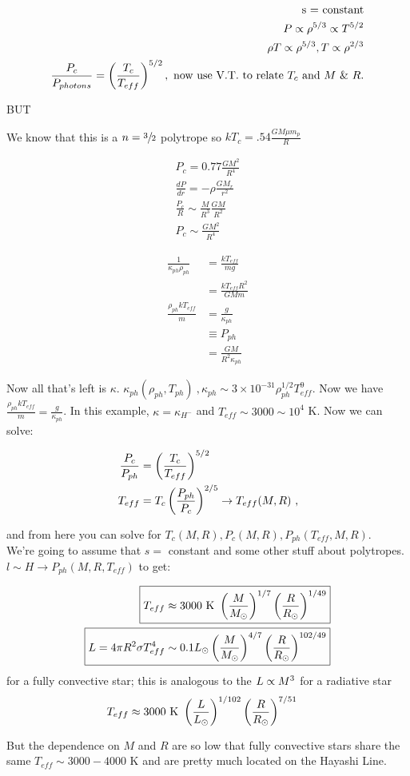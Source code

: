 \begin{align}
\text{s = constant}\\
P \propto \rho^{5/3} \propto T^{5/2}\\
\rho T \propto \rho^{5/3}, T \propto \rho^{2/3}\\
\frac{P_c}{P_{photons}} = \left( \frac{T_c}{T_{eff}} \right) ^{5/2},\text{ now use V.T. to relate $T_c$ and $M$ \& $R$.}
\end{align}
\begin{center}
{\Huge BUT}
\end{center}
We know that this is a $n=\sfrac{3}{2}$ polytrope so $kT_c = .54 \frac{GM\mu m_p}{R}$

\begin{align}
P_c = 0.77 \frac{GM^2}{R^4}\\
\frac{dP}{dr} = -\rho \frac{GM_r}{r^2}\\
\frac{P_c}{R} \sim \frac{M}{R^3}\frac{GM}{R^2}\\
P_c \sim \frac{GM^2}{R^4}
\end{align}

\begin{align}
\frac{1}{\kappa_{ph}\rho_{ph}} &= \frac{kT_{eff}}{mg} \\
&= \frac{kT_{eff}R^2}{GMm}\\
\frac{\rho_{ph}kT_{eff}}{m} &= \frac{g}{\kappa_{ph}}\\
&\equiv P_{ph}\\
& = \frac{GM}{R^2\kappa_{ph}}
\end{align}

Now all that's left is $\kappa$. $\kappa_{ph}(\rho_{ph},T_{ph})~, \kappa_{ph} \sim 3 \times 10^{-31} \rho_{ph}^{1/2} T_{eff}^9$. Now we have $\frac{\rho_{ph} kT_{eff}}{m} = \frac{g}{\kappa_{ph}}$. In this example, $\kappa = \kappa_{H^-}$ and $T_{eff} \sim 3000 \sim 10^4$ K. Now we can solve:

\begin{align}
\frac{P_c}{P_{ph}}&= \left( \frac{T_c}{T_{eff}} \right)^{5/2}\\
T_{eff} &= T_c \left( \frac{P_{ph}}{P_c	} \right) ^{2/5}\rightarrow T_{eff}(M,R)~,
\end{align}

and from here you can solve for $T_c(M,R), P_c(M,R), P_{ph}(T_{eff},M,R)$.\\

We're going to assume that $s=$ constant and some other stuff about polytropes. $l \sim H \rightarrow P_{ph}(M,R,T_{eff})$ to get:

\begin{align}
\Aboxed{T_{eff} &\approx 3000 \text{ K }\lp \frac{M}{M_\odot} \rp^{1/7} \lp \frac{R}{R_\odot} \rp^{1/49}}\\
\Aboxed{L = 4 \pi R^2 \sigma T_{eff}^4 &\sim 0.1 L_\odot \lp \frac{M}{M_\odot} \rp^{4/7} \lp \frac{R}{R_\odot} \rp^{102/49}}
\end{align}
for a fully convective star; this is analogous to the $L \propto M^3$ for a radiative star
\begin{align}
T_{eff} &\approx 3000 \text{ K } \left( \frac{L}{L_\odot} \right)^{1/102} \left( \frac{R}{R_\odot} \right)^{7/51}
\end{align}

But the dependence on $M$ and $R$ are so low that fully convective stars share the same $T_{eff} \sim 3000-4000$ K and are pretty much located on the Hayashi Line.

